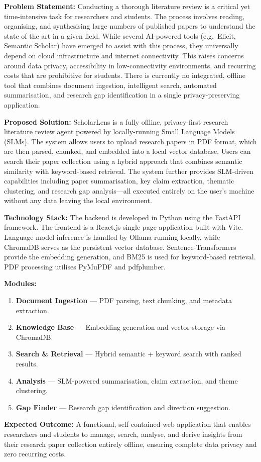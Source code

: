\documentclass[12pt,a4paper]{article}
\begin{document}
\textbf{Problem Statement:}
Conducting a thorough literature review is a critical yet time-intensive
task for researchers and students.  The process involves reading,
organising, and synthesising large numbers of published papers to
understand the state of the art in a given field.  While several
AI-powered tools (e.g.\ Elicit, Semantic Scholar) have emerged to assist
with this process, they universally depend on cloud infrastructure and
internet connectivity.  This raises concerns around data privacy,
accessibility in low-connectivity environments, and recurring costs that
are prohibitive for students.  There is currently no integrated, offline
tool that combines document ingestion, intelligent search, automated
summarisation, and research gap identification in a single
privacy-preserving application.

\textbf{Proposed Solution:}
ScholarLens is a fully offline, privacy-first research literature review
agent powered by locally-running Small Language Models (SLMs).  The system
allows users to upload research papers in PDF format, which are then
parsed, chunked, and embedded into a local vector database.  Users can
search their paper collection using a hybrid approach that combines
semantic similarity with keyword-based retrieval.  The system further
provides SLM-driven capabilities including paper summarisation, key claim
extraction, thematic clustering, and research gap analysis---all executed
entirely on the user's machine without any data leaving the local
environment.

\textbf{Technology Stack:}
The backend is developed in Python using the FastAPI framework.
The frontend is a React.js single-page application built with Vite.
Language model inference is handled by Ollama running locally, while
ChromaDB serves as the persistent vector database.
Sentence-Transformers provide the embedding generation, and BM25 is used
for keyword-based retrieval.  PDF processing utilises PyMuPDF and
pdfplumber.

\textbf{Modules:}
\begin{enumerate}[leftmargin=2em, nosep]
    \item \textbf{Document Ingestion} --- PDF parsing, text chunking, and
          metadata extraction.
    \item \textbf{Knowledge Base} --- Embedding generation and vector
          storage via ChromaDB.
    \item \textbf{Search \& Retrieval} --- Hybrid semantic + keyword search
          with ranked results.
    \item \textbf{Analysis} --- SLM-powered summarisation, claim extraction,
          and theme clustering.
    \item \textbf{Gap Finder} --- Research gap identification and direction
          suggestion.
\end{enumerate}

\textbf{Expected Outcome:}
A functional, self-contained web application that enables researchers and
students to manage, search, analyse, and derive insights from their
research paper collection entirely offline, ensuring complete data privacy
and zero recurring costs.
\end{document}
